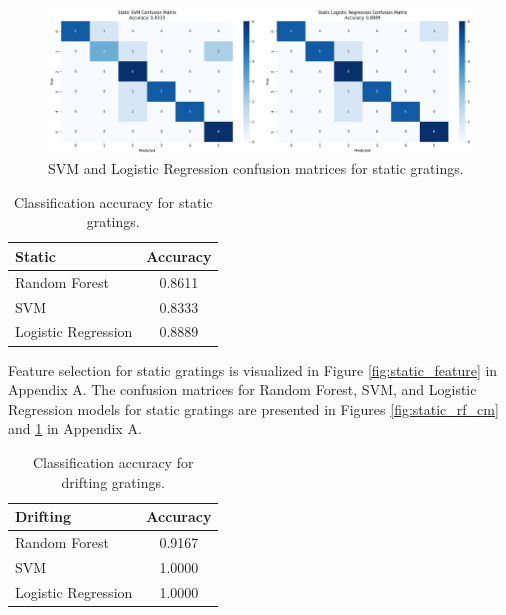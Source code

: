 \documentclass[10pt,twocolumn]{article}
\begin{document}
\begin{figure}[H]
  \centering
  \includegraphics[width=\linewidth]{report_images/static_SVM_LogR_confusion_matrix.png}
  \caption{SVM and Logistic Regression confusion matrices for static gratings.}
  \label{fig:static_svm_logr_cm}
\end{figure}

\begin{table}[H]
  \centering
  \begin{tabular}{l c}
    \hline
    \textbf{Static} & \textbf{Accuracy} \\
    \hline
    Random Forest        & 0.8611 \\
    SVM                  & 0.8333 \\
    Logistic Regression  & 0.8889 \\
    \hline
  \end{tabular}
  \caption{Classification accuracy for static gratings.}
  \label{tab:static_performance}
\end{table}

Feature selection for static gratings is visualized in Figure \ref{fig:static_feature} in Appendix A. The confusion matrices for Random Forest, SVM, and Logistic Regression models for static gratings are presented in Figures \ref{fig:static_rf_cm} and \ref{fig:static_svm_logr_cm} in Appendix A.

\begin{table}[H]
  \centering
  \begin{tabular}{l c}
    \hline
    \textbf{Drifting} & \textbf{Accuracy} \\
    \hline
    Random Forest        & 0.9167 \\
    SVM                  & 1.0000 \\
    Logistic Regression  & 1.0000 \\
    \hline
  \end{tabular}
  \caption{Classification accuracy for drifting gratings.}
  \label{tab:drifting_performance}
\end{table}
\end{document}
